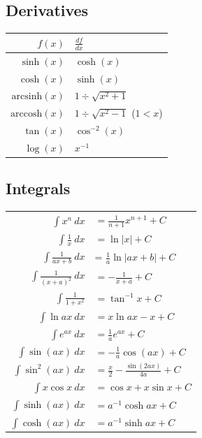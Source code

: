\subsection{Derivatives}
\begin{tabular}{r|l}
    $f(x)$                & $\frac{df}{dx}$                 \\
    \hline
    $\sinh(x)$            & $\cosh(x)$                      \\
    $\cosh(x)$            & $\sinh(x)$                      \\
    $\mathrm{arcsinh}(x)$ & $1 \div \sqrt{x^2+1}$           \\
    $\mathrm{arccosh}(x)$ & $1 \div \sqrt{x^2 - 1}$ ($1<x$) \\
    $\tan(x)$             & $\cos^{-2}(x)$                  \\
    $\log(x)$             & $x^{-1}$
\end{tabular}

\subsection{Integrals}
\begin{tabular}[h]{rl}
    $\int x^n\ dx$               & $= \frac{1}{n+1}x^{n+1} + C$             \\
    $\int \frac{1}{x}\ dx$       & $= \ln |x| + C$                          \\
    $\int \frac{1}{ax + b}\ dx$  & = $\frac{1}{a} \ln |ax+b| + C$           \\
    $\int \frac{1}{(x+a)^2}\ dx$ & $= -\frac{1}{x+a} + C$                   \\
    $\int \frac{1}{1 + x^2}$     & $= \tan^{-1} x + C$                      \\
    $\int \ln ax\ dx$            & $= x\ln ax - x + C$                      \\
    $\int e^{ax}\ dx$            & $= \frac{1}{a} e^{ax} + C$               \\
    $\int \sin(ax)\ dx$          & $= -\frac{1}{a}\cos(ax) + C$             \\
    $\int \sin^2(ax)\ dx$        & $= \frac{x}{2}-\frac{\sin(2ax)}{4a} + C$ \\
    $\int x\cos x\ dx$           & $= \cos x + x\sin x + C$                 \\
    $\int \sinh(ax)\ dx$         & $= a^{-1}\cosh{ax} + C$                  \\
    $\int \cosh(ax)\ dx$         & $= a^{-1}\sinh{ax} + C$                  \\
\end{tabular}

